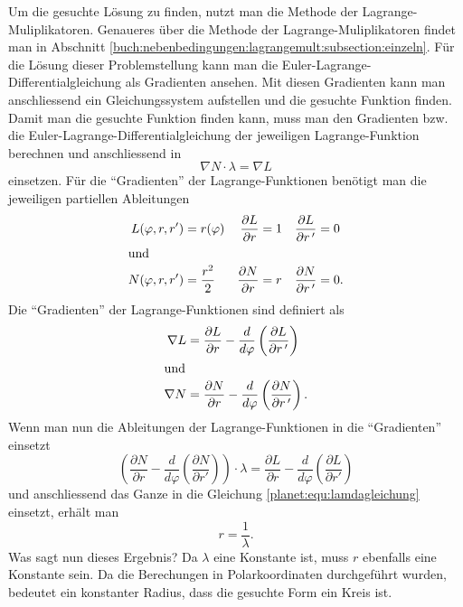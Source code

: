 Um die gesuchte Lösung zu finden, nutzt man die Methode der Lagrange-Muliplika\-to\-ren.
Genaueres über die Methode der Lagrange-Muliplika\-to\-ren findet man in Abschnitt \ref{buch:nebenbedingungen:lagrangemult:subsection:einzeln}.
%
%
Für die Lösung dieser Problemstellung kann man die Euler-Lagrange-Dif\-fe\-ren\-ti\-al\-glei\-chung als Gradienten ansehen.
Mit diesen Gradienten kann man anschliessend ein Gleichungssystem aufstellen und die gesuchte Funktion finden.
Damit man die gesuchte Funktion finden kann, muss man den Gradienten bzw. die Euler-Lagrange-Differential\-glei\-chung der jeweiligen Lagrange-Funktion berechnen und anschliessend in
\begin{equation}
	\nabla N \cdot \lambda = \nabla L
	\label{planet:equ:lamdagleichung}
\end{equation}
einsetzen.
Für die ``Gradienten'' der Lagrange-Funktionen benötigt man die jeweiligen partiellen Ableitungen
%
\begin{align*}
	L(\varphi ,r,r') &= r(\varphi)& \frac{\partial L}{\partial r} &= 1& \frac{\partial L}{\partial r\,'} &= 0 \\
\intertext{und}
	N(\varphi ,r,r') &= \frac{r^2}{2}& \frac{\partial N}{\partial r} &= r& \frac{\partial N}{\partial r\,'} &= 0.
\end{align*}
Die ``Gradienten'' der Lagrange-Funktionen sind definiert als 
\begin{align*}
	\nabla L &= \frac{\partial L}{\partial r} - \frac{d}{d\varphi}\left(\frac{\partial L}{\partial r\,'} \right)\\
\intertext{und}
	\nabla N &= \frac{\partial N}{\partial r} - \frac{d}{d\varphi}\left(\frac{\partial N}{\partial r\,'} \right).
\end{align*}
Wenn man nun die Ableitungen der Lagrange-Funktionen in die ``Gradienten'' einsetzt
\begin{equation*}
	\left(\frac{\partial N}{\partial r} - \frac{d}{d\varphi}\left(\frac{\partial N}{\partial r'}\right)\right)\cdot \lambda = \frac{\partial L}{\partial r}-  \frac{d}{d\varphi}\left( \frac{\partial L}{\partial r'} \right)
\end{equation*} 
und anschliessend das Ganze in die Gleichung \eqref{planet:equ:lamdagleichung} einsetzt, erhält man
\begin{equation*}
	r = \frac{1}{\lambda}.
\end{equation*}
Was sagt nun dieses Ergebnis?
Da \(\lambda\) eine Konstante ist, muss \(r\) ebenfalls eine Konstante sein.
Da die Berechungen in Polarkoordinaten durchgeführt wurden, bedeutet ein konstanter Radius, dass die gesuchte Form ein Kreis ist.

